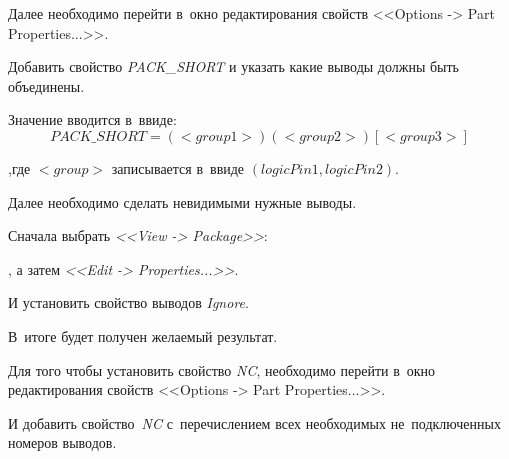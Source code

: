 Далее необходимо перейти в~окно редактирования свойств <<Options -> Part Properties...>>.
	\begin{figure}[H]
	\end{figure}

Добавить свойство \textit{PACK\_SHORT} и указать какие выводы должны быть объединены. 
	\begin{figure}[H]
	\end{figure}
Значение вводится в~ввиде:
	\begin{equation}
		PACK\_SHORT = (<group1>)(<group2>)[<group3>]
	\end{equation}
	\begin{ESKDexplanation}
		\item[,где] $<group>$ записывается в~ввиде $(logicPin1, logicPin2)$.
	\end{ESKDexplanation}
	
Далее необходимо сделать невидимыми нужные выводы.

Сначала выбрать \textit{<<View -> Package>>}:
	\begin{figure}[H]
	\end{figure}
, а затем \textit{<<Edit -> Properties...>>}. 
	\begin{figure}[H]
	\end{figure}
И установить свойство выводов \textit{Ignore}.
	\begin{figure}[H]
	\end{figure}
В~итоге будет получен желаемый результат.

Для того чтобы установить свойство \textit{NC}, необходимо перейти в~окно редактирования свойств <<Options -> Part Properties...>>.
	 \begin{figure}[H]
	 \end{figure}
И добавить свойство~\textit{NC} с~перечислением всех необходимых не~подключенных номеров выводов.
	\begin{figure}[H]
	\end{figure}

	
